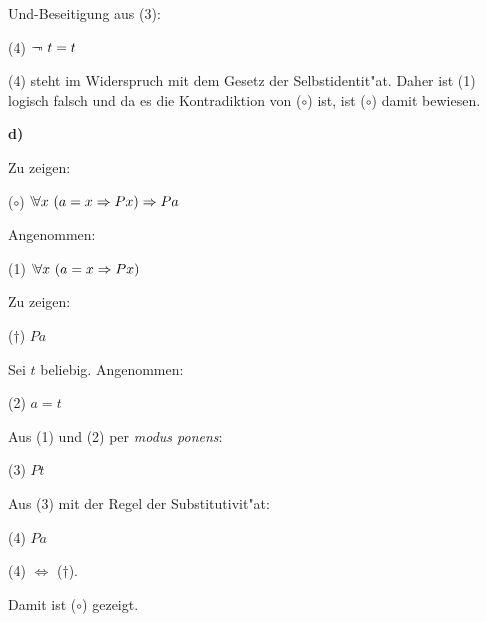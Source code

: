 \documentclass[a4paper]{article}
\begin{document}
\vspace{2pt}
Und-Beseitigung aus (3):

\vspace{2pt}
(4) \hspace*{1em} $\neg\hspace*{-0.5em}\neg \ t = t$

\vspace{10pt}
(4) steht im Widerspruch mit dem Gesetz der Selbstidentit"at. Daher ist (1) logisch falsch und da es die Kontradiktion von ($\circ$) ist, ist ($\circ$) damit bewiesen.

\newpage



\noindent \textbf{d) }
\vspace{4pt}

Zu zeigen:

\vspace{2pt}
($\circ$) \hspace*{1em} $\Forall x \ (a=x \Then Px) \Then Pa$

\vspace{2pt}
Angenommen:

\vspace{2pt}
(1) \hspace*{1em} $\Forall x \ (a=x \Then Px)$

\vspace{2pt}
Zu zeigen:  

\vspace{2pt}
($\dagger$) \hspace*{1em}  $Pa$

\vspace{2pt}
Sei $t$ beliebig. Angenommen:

\vspace{2pt}
(2) \hspace*{1em} $a=t$

\vspace{2pt}
Aus (1) und (2) per \emph{modus ponens}: 

\vspace{2pt}
(3) \hspace*{1em}  $Pt$
\vspace{2pt}

Aus (3) mit der Regel der Substitutivit"at: 

\vspace{2pt}
(4) \hspace*{1em}  $Pa$


\vspace{10pt}
(4) $\Leftrightarrow$ ($\dagger$). 

Damit ist ($\circ$) gezeigt.
\end{document}
